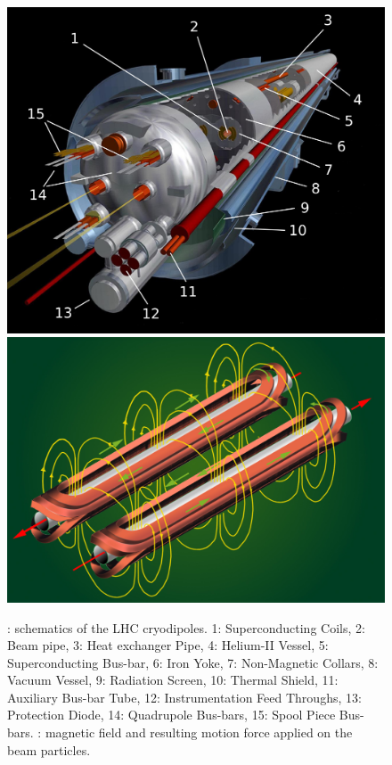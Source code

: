 \endgroup
\begingroup\setlength{\intextsep}{5pt}\setlength{\columnsep}{15pt}
	
	\begin{figure}
		\begin{minipage}{\linewidth}
			\centering\captionsetup[subfigure]{justification=centering}
			\includegraphics[width = \linewidth]{fig/chapt2/LHC-dipole.png}
			\subcaption{\label{fig:LHCDipole:A}}
			\includegraphics[width = \linewidth]{fig/chapt2/LHC-dipole-field.jpg}
			\subcaption{\label{fig:LHCDipole:B}}
		\end{minipage}
		\caption{\label{fig:LHCDipole} : schematics of the LHC cryodipoles. 1: Superconducting Coils, 2: Beam pipe, 3: Heat exchanger Pipe, 4: Helium-II Vessel, 5: Superconducting Bus-bar, 6: Iron Yoke, 7: Non-Magnetic Collars, 8: Vacuum Vessel, 9: Radiation Screen, 10: Thermal Shield, 11: Auxiliary Bus-bar Tube, 12: Instrumentation Feed Throughs, 13: Protection Diode, 14: Quadrupole Bus-bars, 15: Spool Piece Bus-bars. : magnetic field and resulting motion force applied on the beam particles.}
	\end{figure}
	
